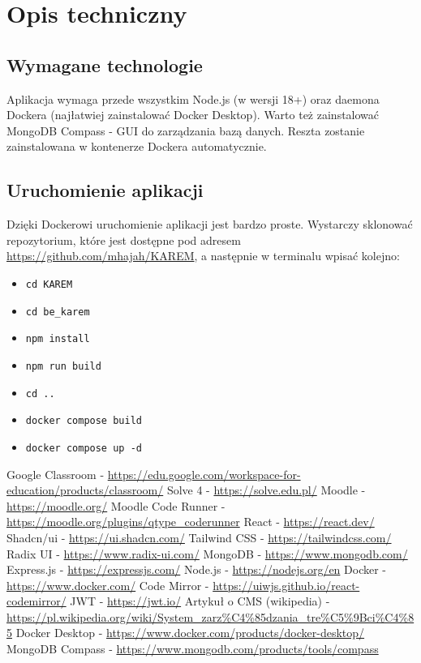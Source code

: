 \documentclass[shortabstract,inz]{iithesis}
\begin{document}
\chapter{Opis techniczny}
\section{Wymagane technologie}
Aplikacja wymaga przede wszystkim Node.js (w wersji 18+) oraz daemona Dockera (najłatwiej zainstalować Docker Desktop). Warto też zainstalować MongoDB Compass \cite{bib:mongo-db-compass} - GUI do zarządzania bazą danych. Reszta zostanie zainstalowana w kontenerze Dockera automatycznie.

\section{Uruchomienie aplikacji}
Dzięki Dockerowi uruchomienie aplikacji jest bardzo proste. Wystarczy sklonować repozytorium, które jest dostępne pod adresem \url{https://github.com/mhajah/KAREM}, a następnie w terminalu wpisać kolejno:
\begin{itemize}
    \item \texttt{cd KAREM}
    \item \texttt{cd be\_karem}
    \item \texttt{npm install}
    \item \texttt{npm run build}
    \item \texttt{cd ..}
    \item \texttt{docker compose build}
    \item \texttt{docker compose up -d}
\end{itemize}





\begin{thebibliography}{1}
 Google Classroom - \url{https://edu.google.com/workspace-for-education/products/classroom/}
 Solve 4 - \url{https://solve.edu.pl/}
 Moodle - \url{https://moodle.org/}
 Moodle Code Runner - \url{https://moodle.org/plugins/qtype_coderunner}
 React - \url{https://react.dev/}
 Shadcn/ui - \url{https://ui.shadcn.com/}
 Tailwind CSS - \url{https://tailwindcss.com/}
 Radix UI - \url{https://www.radix-ui.com/}
 MongoDB - \url{https://www.mongodb.com/}
 Express.js - \url{https://expressjs.com/}
 Node.js - \url{https://nodejs.org/en}
 Docker - \url{https://www.docker.com/}
 Code Mirror - \url{https://uiwjs.github.io/react-codemirror/}
 JWT - \url{https://jwt.io/}
 Artykuł o CMS (wikipedia) - \url{https://pl.wikipedia.org/wiki/System_zarz%C4%85dzania_tre%C5%9Bci%C4%85}
 Docker Desktop - \url{https://www.docker.com/products/docker-desktop/}
 MongoDB Compass - \url{https://www.mongodb.com/products/tools/compass}
\end{thebibliography}
\end{document}
